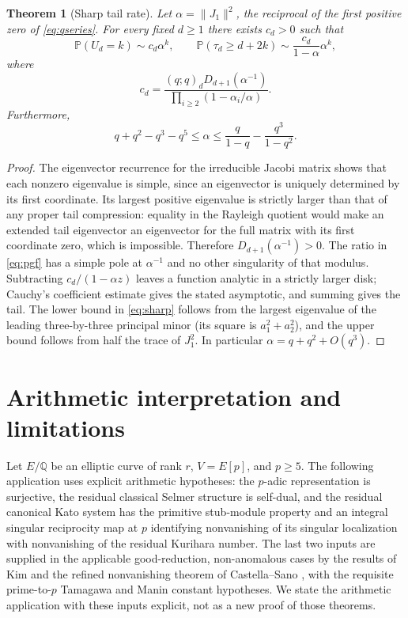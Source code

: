 \documentclass[11pt]{article}
\newtheorem{theorem}{Theorem}[section]
\theoremstyle{definition}\newtheorem{definition}[theorem]{Definition}
\newcommand{\Prob}{\mathbb P}
\newcommand{\Q}{\mathbb Q}
\begin{document}
\begin{theorem}[Sharp tail rate]\label{thm:tail}
Let $\alpha=\|J_1\|^2$, the reciprocal of the first positive zero of \eqref{eq:qseries}. For every fixed $d\geq1$ there exists $c_d>0$ such that
\[
 \Prob(U_d=k)\sim c_d\alpha^k,\qquad
 \Prob(\tau_d\geq d+2k)\sim\frac{c_d}{1-\alpha}\alpha^k,
\]
where
\[
 c_d=\frac{(q;q)_dD_{d+1}(\alpha^{-1})}{\prod_{i\geq2}(1-\alpha_i/\alpha)}.
\]
Furthermore,
\begin{equation}\label{eq:sharp}
 q+q^2-q^3-q^5\leq\alpha\leq\frac q{1-q}-\frac{q^3}{1-q^2}.
\end{equation}
\end{theorem}
\begin{proof}
The eigenvector recurrence for the irreducible Jacobi matrix shows that each nonzero eigenvalue is simple, since an eigenvector is uniquely determined by its first coordinate. Its largest positive eigenvalue is strictly larger than that of any proper tail compression: equality in the Rayleigh quotient would make an extended tail eigenvector an eigenvector for the full matrix with its first coordinate zero, which is impossible. Therefore $D_{d+1}(\alpha^{-1})>0$. The ratio in \eqref{eq:pgf} has a simple pole at $\alpha^{-1}$ and no other singularity of that modulus. Subtracting $c_d/(1-\alpha z)$ leaves a function analytic in a strictly larger disk; Cauchy's coefficient estimate gives the stated asymptotic, and summing gives the tail. The lower bound in \eqref{eq:sharp} follows from the largest eigenvalue of the leading three-by-three principal minor (its square is $a_1^2+a_2^2$), and the upper bound follows from half the trace of $J_1^2$. In particular $\alpha=q+q^2+O(q^3)$.
\end{proof}

\section{Arithmetic interpretation and limitations}
Let $E/\Q$ be an elliptic curve of rank $r$, $V=E[p]$, and $p\geq5$. The following application uses explicit arithmetic hypotheses: the $p$-adic representation is surjective, the residual classical Selmer structure is self-dual, and the residual canonical Kato system has the primitive stub-module property and an integral singular reciprocity map at $p$ identifying nonvanishing of its singular localization with nonvanishing of the residual Kurihara number. The last two inputs are supplied in the applicable good-reduction, non-anomalous cases by the results of Kim \cite[Theorem 2.6, Proposition 2.9, Theorem 3.11]{Kim} and the refined nonvanishing theorem of Castella--Sano \cite[Theorem B]{CS}, with the requisite prime-to-$p$ Tamagawa and Manin constant hypotheses. We state the arithmetic application with these inputs explicit, not as a new proof of those theorems.
\end{document}
